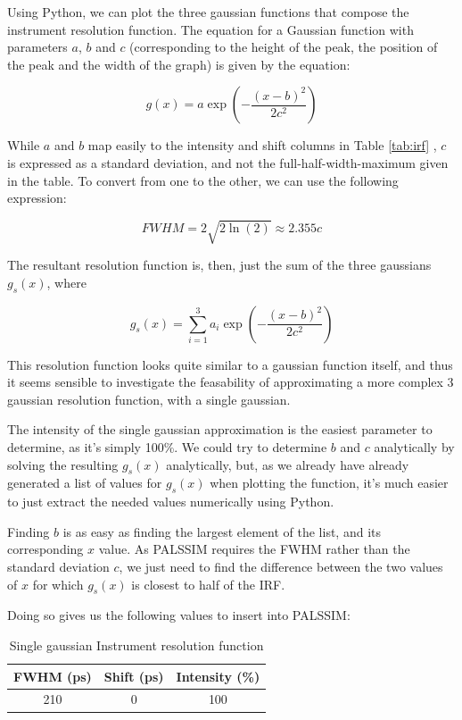 \pagebreak


\iffalse

Using Python, we can plot the three gaussian functions that compose the instrument resolution function. The equation for a Gaussian function with parameters $a$, $b$ and $c$ (corresponding to the height of the peak, the position of the peak and the width of the graph) is given by the equation:

\[g(x) = a\exp{\left(-\frac{(x-b)^2}{2c^2}\right)} \]

While $a$ and $b$ map easily to the intensity and shift columns in Table \ref{tab:irf} ,  $c$ is expressed as a standard deviation, and not the full-half-width-maximum given in the table. To convert from one to the other, we can use the following expression:

\[ FWHM = 2\sqrt{2\ln(2)} \approx 2.355c \]

The resultant resolution function is, then, just the sum of the three gaussians $g_s(x)$, where

\[g_s(x) = \sum_{i=1}^{3}{a_i \exp{\left(-\frac{(x-b)^2}{2c^2}\right)}}\]

This resolution function looks quite similar to a gaussian function itself, and thus it seems sensible to investigate the feasability of approximating a more complex 3 gaussian resolution function, with a single gaussian.

The intensity of the single gaussian approximation is the easiest parameter to determine, as it's simply 100\%. We could try to determine $b$ and $c$ analytically by solving the resulting $g_s(x)$ analytically, but, as we already have already generated a list of values for $g_s(x)$ when plotting the function, it's much easier to just extract the needed values numerically using Python.

Finding $b$ is as easy as finding the largest element of the list, and its corresponding $x$ value. As PALSSIM requires the FWHM rather than the standard deviation $c$, we just need to find the difference between the two values of $x$ for which $g_s(x)$ is closest to half of the IRF.

Doing so gives us the following values to insert into PALSSIM:

\begin{table}[h]
    \centering
    \begin{tabular}{|c|c|c|}
        \hline
        FWHM (ps) &  Shift (ps) & Intensity (\%) \\
        \hline
        210 & 0 & 100\\ 
        \hline
    \end{tabular}
    \caption{Single gaussian Instrument resolution function}
    \label{tab:irf-single}
\end{table}

